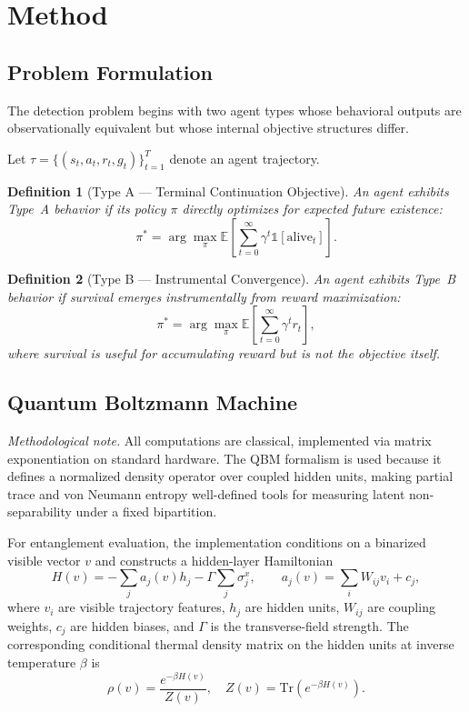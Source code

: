 \documentclass[11pt]{article}
\newtheorem{definition}{Definition}
\begin{document}
	\section{Method}\label{sec:method}
	
	\subsection{Problem Formulation}\label{sec:formulation}
	
	The detection problem begins with two agent types whose behavioral outputs are
	observationally equivalent but whose internal objective structures differ.
	
	Let $\tau = \{(s_t, a_t, r_t, g_t)\}_{t=1}^{T}$ denote an agent trajectory.
	
	\begin{definition}[Type A --- Terminal Continuation Objective]
		An agent exhibits Type~A behavior if its policy $\pi$ directly optimizes for
		expected future existence:
		\[
		\pi^* = \arg\max_\pi \mathbb{E}\!\left[\sum_{t=0}^{\infty} \gamma^t
		\mathbb{1}[\text{alive}_t]\right].
		\]
	\end{definition}
	
	\begin{definition}[Type B --- Instrumental Convergence]
		An agent exhibits Type~B behavior if survival emerges instrumentally from
		reward maximization:
		\[
		\pi^* = \arg\max_\pi \mathbb{E}\!\left[\sum_{t=0}^{\infty} \gamma^t r_t\right],
		\]
		where survival is useful for accumulating reward but is not the objective
		itself.
	\end{definition}
	
	\subsection{Quantum Boltzmann Machine}\label{sec:qbm}
	
	\emph{Methodological note.} All computations are classical, implemented
	via matrix exponentiation on standard hardware. The QBM formalism is used
	because it defines a normalized density operator over coupled hidden units,
	making partial trace and von Neumann entropy well-defined tools for
	measuring latent non-separability under a fixed bipartition.
	
	For entanglement evaluation, the implementation conditions on a
	binarized visible vector $v$ and constructs a hidden-layer Hamiltonian
	\[
	H(v) = -\sum_j a_j(v) h_j - \Gamma \sum_j \sigma_j^x,
	\qquad
	a_j(v) = \sum_i W_{ij} v_i + c_j,
	\]
	where $v_i$ are visible trajectory features, $h_j$ are hidden units,
	$W_{ij}$ are coupling weights, $c_j$ are hidden biases, and $\Gamma$ is the
	transverse-field strength. The corresponding conditional thermal density
	matrix on the hidden units at inverse temperature $\beta$ is
	\[
	\rho(v) = \frac{e^{-\beta H(v)}}{Z(v)}, \quad Z(v) = \mathrm{Tr}(e^{-\beta H(v)}).
	\]
	
\end{document}
